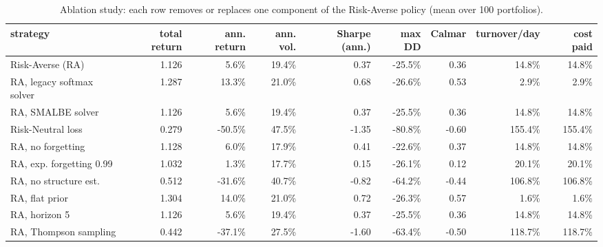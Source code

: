 \begin{table}[ht!]
\centering
\footnotesize
\setlength{\tabcolsep}{4pt}
\begin{tabular}{lrrrrrrrr}
\hline
strategy & total return & ann. return & ann. vol. & Sharpe (ann.) & max DD & Calmar & turnover/day & cost paid \\
\hline
Risk-Averse (RA) & 1.126 & 5.6\% & 19.4\% & 0.37 & -25.5\% & 0.36 & 14.8\% & 14.8\% \\
RA, legacy softmax solver & 1.287 & 13.3\% & 21.0\% & 0.68 & -26.6\% & 0.53 & 2.9\% & 2.9\% \\
RA, SMALBE solver & 1.126 & 5.6\% & 19.4\% & 0.37 & -25.5\% & 0.36 & 14.8\% & 14.8\% \\
Risk-Neutral loss & 0.279 & -50.5\% & 47.5\% & -1.35 & -80.8\% & -0.60 & 155.4\% & 155.4\% \\
RA, no forgetting & 1.128 & 6.0\% & 17.9\% & 0.41 & -22.6\% & 0.37 & 14.8\% & 14.8\% \\
RA, exp. forgetting 0.99 & 1.032 & 1.3\% & 17.7\% & 0.15 & -26.1\% & 0.12 & 20.1\% & 20.1\% \\
RA, no structure est. & 0.512 & -31.6\% & 40.7\% & -0.82 & -64.2\% & -0.44 & 106.8\% & 106.8\% \\
RA, flat prior & 1.304 & 14.0\% & 21.0\% & 0.72 & -26.3\% & 0.57 & 1.6\% & 1.6\% \\
RA, horizon 5 & 1.126 & 5.6\% & 19.4\% & 0.37 & -25.5\% & 0.36 & 14.8\% & 14.8\% \\
RA, Thompson sampling & 0.442 & -37.1\% & 27.5\% & -1.60 & -63.4\% & -0.50 & 118.7\% & 118.7\% \\
\hline
\end{tabular}
\caption{Ablation study: each row removes or replaces one component of the Risk-Averse policy (mean over 100 portfolios).}
\label{tab:ablation}
\end{table}
